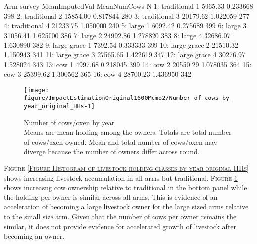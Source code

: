 \begin{Schunk}
\begin{Soutput}
            Arm survey MeanImputedVal MeanNumCows   N
 1: traditional      1        5065.33    0.233668 398
 2: traditional      2       15854.00    0.817844 280
 3: traditional      3       20179.62    1.022059 277
 4: traditional      4       21233.75    1.050000 240
 5:       large      1        6092.42    0.275689 399
 6:       large      3       31056.41    1.625000 386
 7:       large      2       24992.86    1.278820 383
 8:       large      4       32686.07    1.630890 382
 9: large grace      1        7392.54    0.333333 399
10: large grace      2       21510.32    1.150943 341
11: large grace      3       27565.65    1.422619 347
12: large grace      4       30276.97    1.528024 343
13:         cow      1        4997.68    0.218045 399
14:         cow      2       20550.29    1.078035 364
15:         cow      3       25399.62    1.300562 365
16:         cow      4       28700.23    1.436950 342
\end{Soutput}
\end{Schunk}
\begin{Schunk}
\begin{figure}

{\centering \texttt{[image: figure/ImpactEstimationOriginal1600Memo2/Number\_of\_cows\_by\_year\_original\_HHs-1]} 

}

\caption{Number of cows/oxen by year\\ {\footnotesize Means are mean holding among the owners. Totals are total number of cows/oxen owned. Mean and total number of cows/oxen may diverge because the number of owners differ across round.\setlength{\baselineskip}{8pt}}}\label{Figure Number of cows by year original HHs}
\end{figure}
\end{Schunk}


\begin{palepinkleftbar}
\begin{finding}
\textsc{Figure \ref{Figure Histogram of livestock holding classes by year original HHs}} shows increasing livestock accumulation in all arms but \textsf{traditional}. 
\textsc{Figure \ref{Figure Number of cows by year original HHs}} shows increasng cow ownership relative to \textsf{traditional} in the bottom panel while the holding per owner is similar across all arms. This is evidence of an acceleration of becoming a large livestock owner for the large sized arms relative to the small size arm. Given that the number of cows per owner remains the similar, it does not provide evidence for accelerated growth of livestock after becoming an owner.
\end{finding}
\end{palepinkleftbar}



